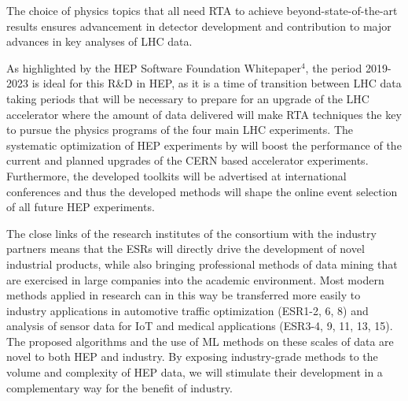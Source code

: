 The choice of physics topics that all need RTA to achieve beyond-state-of-the-art results ensures advancement in detector development and contribution to major advances in key analyses of LHC data.

As highlighted by the HEP Software Foundation Whitepaper$^{4}$, the period 2019-2023 is ideal for this R\&D in HEP, as it is a time of transition between LHC data taking periods that will be necessary to prepare for an upgrade of the LHC accelerator where the amount of data delivered will make RTA techniques  the key to pursue the physics programs of the four main LHC experiments.
The systematic optimization of HEP experiments by \acronym will boost the performance of the current and planned upgrades of the CERN based accelerator experiments.
Furthermore, the developed toolkits will be advertised at international conferences and thus the developed methods will shape the online event selection of all future HEP experiments. 

The close links of the research institutes of the consortium with the industry partners means that the ESRs will directly drive the development of novel industrial products, while also bringing professional methods of data mining that are exercised in large companies into the academic environment. 
Most modern methods applied in research can in this way be transferred more easily to industry applications in automotive traffic optimization (ESR1-2, 6, 8) and analysis of sensor data for IoT and medical applications (ESR3-4, 9, 11, 13, 15).
The proposed algorithms and the use of ML methods on these scales of data are novel to both HEP and industry. 
By exposing industry-grade methods to the volume and complexity of HEP data, we will stimulate their development in a complementary way for the benefit of industry.


